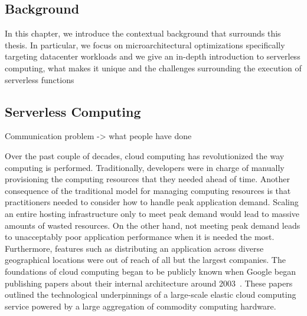 \documentclass[../main.tex]{subfiles}
\begin{document}
\ifx\chapincluded\undefined
  \begin{refsection}
 \fi

\chapter{Background}
\label{chap:background}
In this chapter, we introduce the contextual background that surrounds
this thesis. In particular, we focus on microarchitectural
optimizations specifically targeting datacenter workloads and we give
an in-depth introduction to serverless computing, what makes it unique
and the challenges surrounding the execution of serverless functions



\section{Serverless Computing}
\label{sec:serverless}

Communication problem -> what people have done

Over the past couple of decades, cloud computing has revolutionized
the way computing is performed. Traditionally, developers were in
charge of manually provisioning the computing resources that they
needed ahead of time. Another consequence of the traditional model for
managing computing resources is that practitioners needed to consider
how to handle peak application demand. Scaling an entire hosting
infrastructure only to meet peak demand would lead to massive amounts
of wasted resources. On the other hand, not meeting peak demand leads
to unacceptably poor application performance when it is needed the
most. Furthermore, features such as distributing an application across
diverse geographical locations were out of reach of all but the
largest companies. The foundations of cloud computing began to be
publicly known when Google began publishing papers about their
internal architecture around
2003~\cite{qian2009cloud,gfs,dean2008mapreduce,barroso03_web_searc_planet}. These
papers outlined the technological underpinnings of a large-scale
elastic cloud computing service powered by a large aggregation of
commodity computing hardware.




\end{refsection}
\end{document}
